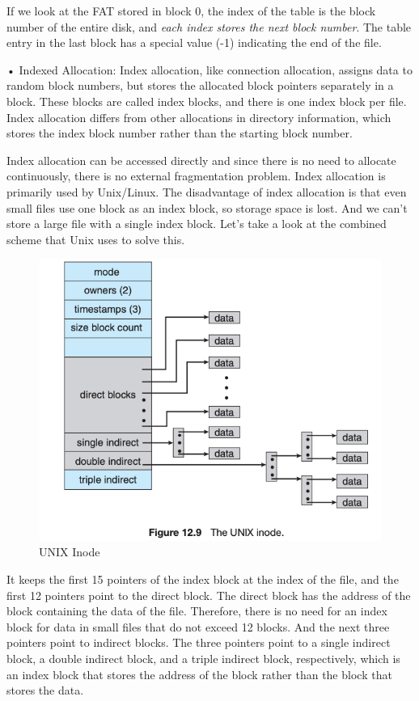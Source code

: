 \documentclass{homework}
\begin{document}
If we look at the FAT stored in block 0, the index of the table is the block number of the entire disk, and \textit{each index stores the next block number}. The table entry in the last block has a special value (-1) indicating the end of the file.

• Indexed Allocation: Index allocation, like connection allocation, assigns data to random block numbers, but stores the allocated block pointers separately in a block. These blocks are called index blocks, and there is one index block per file. Index allocation differs from other allocations in directory information, which stores the index block number rather than the starting block number.

Index allocation can be accessed directly and since there is no need to allocate continuously, there is no external fragmentation problem. Index allocation is primarily used by Unix/Linux. The disadvantage of index allocation is that even small files use one block as an index block, so storage space is lost. And we can't store a large file with a single index block. Let's take a look at the combined scheme that Unix uses to solve this.

\begin{figure}[h]
\begin{center}
\includegraphics[scale=0.7]{41.png}    
\caption{UNIX Inode}
\end{center}
\end{figure}

It keeps the first 15 pointers of the index block at the index of the file, and the first 12 pointers point to the direct block. The direct block has the address of the block containing the data of the file. Therefore, there is no need for an index block for data in small files that do not exceed 12 blocks. And the next three pointers point to indirect blocks. The three pointers point to a single indirect block, a double indirect block, and a triple indirect block, respectively, which is an index block that stores the address of the block rather than the block that stores the data.
\end{document}

